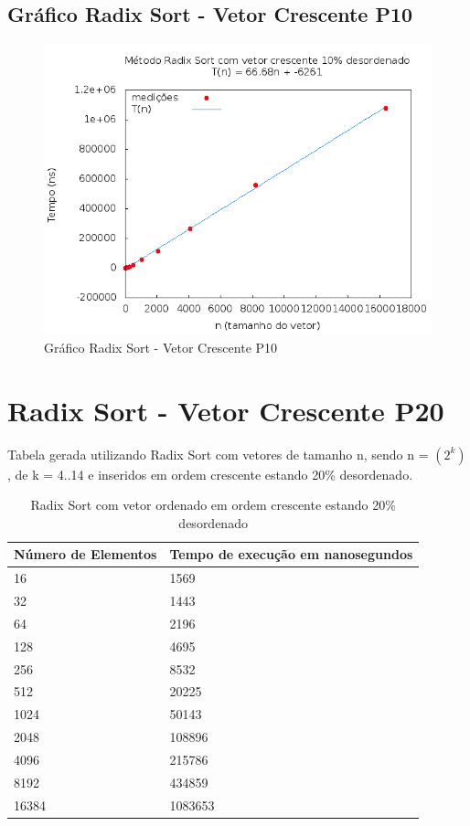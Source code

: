 \documentclass[12pt,a4paper,twoside]{report}
\begin{document}
\subsection{Gráfico Radix Sort - Vetor Crescente P10}
\begin{figure}[H]
    \centering
    \includegraphics[width=0.7\linewidth]{graficos/RadixSort/vIntCrescenteP10/vIntCrescenteP10.png}
  \caption{Gráfico Radix Sort - Vetor Crescente P10}
\end{figure}

\section{Radix Sort - Vetor Crescente P20}
Tabela gerada utilizando Radix Sort com vetores de tamanho n, sendo n = $(2^k)$, de k = 4..14 e inseridos em ordem crescente estando 20\% desordenado.
\begin{table}[H]
\centering
\caption{Radix Sort com vetor ordenado em ordem crescente estando 20\% desordenado}
\label{my-label}
\begin{tabular}{|l|l|}
\hline
\multicolumn{1}{|c|}{\textbf{Número de Elementos}} & \multicolumn{1}{c|}{\textbf{Tempo de execução em nanosegundos}} \\ \hline
16 & 1569 \\ \hline
32 & 1443 \\ \hline
64 & 2196 \\ \hline
128 & 4695 \\ \hline
256 & 8532 \\ \hline
512 & 20225 \\ \hline
1024 & 50143 \\ \hline
2048 & 108896 \\ \hline
4096 & 215786 \\ \hline
8192 & 434859 \\ \hline
16384 & 1083653 \\ \hline
\end{tabular}
\end{table}
\end{document}
